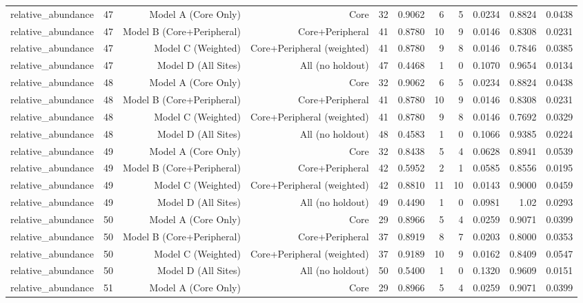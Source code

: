 {\begin{longtable}{lrrrrrrrrrr}
  relative\_abundance & 47 & Model A (Core Only) & Core & 32 & 0.9062 & 6 & 5 & 0.0234 & 0.8824 & 0.0438 \\
  relative\_abundance & 47 & Model B (Core+Peripheral) & Core+Peripheral & 41 & 0.8780 & 10 & 9 & 0.0146 & 0.8308 & 0.0231 \\
  relative\_abundance & 47 & Model C (Weighted) & Core+Peripheral (weighted) & 41 & 0.8780 & 9 & 8 & 0.0146 & 0.7846 & 0.0385 \\
  relative\_abundance & 47 & Model D (All Sites) & All (no holdout) & 47 & 0.4468 & 1 & 0 & 0.1070 & 0.9654 & 0.0134 \\
  relative\_abundance & 48 & Model A (Core Only) & Core & 32 & 0.9062 & 6 & 5 & 0.0234 & 0.8824 & 0.0438 \\
  relative\_abundance & 48 & Model B (Core+Peripheral) & Core+Peripheral & 41 & 0.8780 & 10 & 9 & 0.0146 & 0.8308 & 0.0231 \\
  relative\_abundance & 48 & Model C (Weighted) & Core+Peripheral (weighted) & 41 & 0.8780 & 9 & 8 & 0.0146 & 0.7692 & 0.0329 \\
  relative\_abundance & 48 & Model D (All Sites) & All (no holdout) & 48 & 0.4583 & 1 & 0 & 0.1066 & 0.9385 & 0.0224 \\
  relative\_abundance & 49 & Model A (Core Only) & Core & 32 & 0.8438 & 5 & 4 & 0.0628 & 0.8941 & 0.0539 \\
  relative\_abundance & 49 & Model B (Core+Peripheral) & Core+Peripheral & 42 & 0.5952 & 2 & 1 & 0.0585 & 0.8556 & 0.0195 \\
  relative\_abundance & 49 & Model C (Weighted) & Core+Peripheral (weighted) & 42 & 0.8810 & 11 & 10 & 0.0143 & 0.9000 & 0.0459 \\
  relative\_abundance & 49 & Model D (All Sites) & All (no holdout) & 49 & 0.4490 & 1 & 0 & 0.0981 & 1.02 & 0.0293 \\
  relative\_abundance & 50 & Model A (Core Only) & Core & 29 & 0.8966 & 5 & 4 & 0.0259 & 0.9071 & 0.0399 \\
  relative\_abundance & 50 & Model B (Core+Peripheral) & Core+Peripheral & 37 & 0.8919 & 8 & 7 & 0.0203 & 0.8000 & 0.0353 \\
  relative\_abundance & 50 & Model C (Weighted) & Core+Peripheral (weighted) & 37 & 0.9189 & 10 & 9 & 0.0162 & 0.8409 & 0.0547 \\
  relative\_abundance & 50 & Model D (All Sites) & All (no holdout) & 50 & 0.5400 & 1 & 0 & 0.1320 & 0.9609 & 0.0151 \\
  relative\_abundance & 51 & Model A (Core Only) & Core & 29 & 0.8966 & 5 & 4 & 0.0259 & 0.9071 & 0.0399 \\

\end{longtable}}

